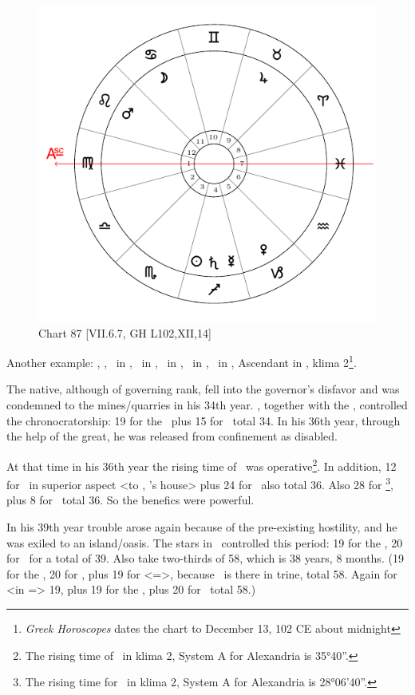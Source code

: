 \newpage
\begin{figure}
\centering
\vspace{0pt}
\includegraphics[width=.68\textwidth]{charts/7_6_07}
\caption{Chart 87 [VII.6.7, GH L102,XII,14] }
\label{fig:chart87}
\end{figure} 

Another example: \Sun, \Saturn, \Mercury\, in \Sagittarius, \Moon\, in \Cancer, \Jupiter\, in \Taurus, \Mars\, in \Leo, \Venus\, in \Capricorn, Ascendant in \Virgo, klima 2\footnote{\textit{Greek Horoscopes} dates the chart to December 13, 102 CE about midnight}.

The native, although of governing rank, fell into the governor’s disfavor and was condemned to the mines/quarries in his 34th year. 
\Mars, together with the \Sun, controlled the chronocratorship: 19 for the \Sun\, plus 15 for \Mars\, total 34. In his 36th year, through the help of the great, he was released from confinement as disabled. 

At that time in his 36th year the rising time of \Leo\, was operative\footnote{The rising time of \Leo\, in klima 2, System A for Alexandria is 35°40''.}. In addition, 12 for \Jupiter\, in superior aspect <to \Scorpio, \Mars’s house> plus 24 for \Taurus\, also total 36. Also 28 for \Capricorn\footnote{The rising time for \Capricorn\, in klima 2, System A for Alexandria is 28°06'40''.}, plus 8 for \Venus\, total 36. So the benefics were powerful. 

In his 39th year trouble arose again because of the pre-existing hostility, and he was exiled to an island/oasis. The stars in \Sagittarius\, controlled this period: 19 for the \Sun, 20 for \Mercury\, for a total of 39. Also take two-thirds of 58, which is 38 years, 8 months. (19 for the \Sun, 20 for \Mercury, plus 19 for \Leo <=\Sun>, because \Mars\, is there in trine, total 58. Again for \Mars\, <in \Leo=\Sun> 19, plus 19 for the \Sun, plus 20 for \Mercury\, total 58.) 

